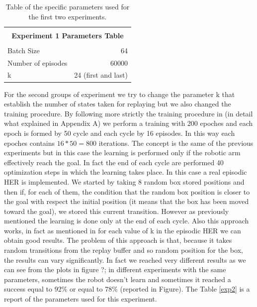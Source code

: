 \documentclass[a4paper]{report}
\begin{document}
\begin{table}[h]
\begin{center}
\begin{tabular}{|l|r|} 



\hline

\multicolumn{2}{|c|}{}\\
\multicolumn{2}{|c|}{\textbf{\large       Experiment 1 Parameters Table}}\\
\multicolumn{2}{|c|}{}\\

\hline

Batch Size 					& 64			\\
Number of episodes			& 60000			\\
k							& 24 (first and last)	\\


\hline
\end{tabular}
\end{center}
\caption{\label{exp1} Table of the specific parameters used for the first two experiments.}
\end{table}

For the second groups of experiment we try to change the parameter k that establish the number of states taken for replaying but we also changed the training procedure. By following more strictly the training procedure in \cite{her} (in detail what explained in Appendix A) we perform a training with 200 epoches and each epoch is formed by 50 cycle and each cycle by 16 episodes. In this way each epoches contains $16 * 50=800$ iterations. The concept is the same of the previous experiments but in this case the learning is performed only if the robotic arm effectively reach the goal. In fact the end of each cycle are performed 40 optimization steps in which the learning takes place. In this case a real episodic HER is implemented. We started by taking 8 random box stored positions and then if, for each of them, the condition that the random box position is closer to the goal with respect the initial position (it means that the box has been moved toward the goal), we stored this current transition. However as previously mentioned the learning is done only at the end of each cycle. Also this approach works, in fact as mentioned in \cite{her} for each value of k in the episodic HER we can obtain good results. The problem of this approach is that, because it takes random transitions from the replay buffer and so random position for the box, the results can vary significantly. In fact we reached very different results as we can see from the plots in figure ?; in different experiments with the same parameters, sometimes the robot doesn't learn and sometimes it reached a success equal to 92\% or equal to 78\% (reported in Figure). The Table \ref{exp2} is a report of the parameters used for this experiment.
\end{document}

